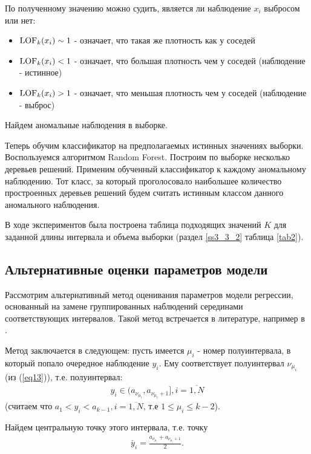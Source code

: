 По полученному значению можно судить, является ли наблюдение $x_i$ выбросом или нет:
\begin{itemize}
    \item $\textup{LOF}_k(x_i)\sim 1$   - означает, что такая же плотность как у соседей\\
    \item $\textup{LOF}_k(x_i)<1$  - означает, что большая плотность чем у соседей (наблюдение - истинное)\\
    \item $\textup{LOF}_k(x_i)>1$ - означает, что меньшая плотность чем у соседей (наблюдение - выброс) 
\end{itemize}

Найдем аномальные наблюдения в выборке.

Теперь обучим классификатор на предполагаемых истинных значениях выборки. Воспользуемся алгоритмом Random Forest. Построим по выборке несколько деревьев решений. 
Применим обученный классификатор к каждому аномальному наблюдению. Тот класс, за который проголосовало наибольшее количество простроенных деревьев решений будем считать истинным классом данного аномального наблюдения.

В ходе экспериментов была построена таблица подходящих значений $K$ для заданной длины интервала и объема выборки (раздел \ref{ss3_3_2} таблица \ref{tab2}).

\newpage
\subsection{Альтернативные оценки параметров модели}
Рассмотрим альтернативный метод оценивания параметров модели регрессии, основанный на замене группированных наблюдений серединами соответствующих интервалов. 
Такой метод встречается в литературе, например в \cite{interval_valued}.

Метод заключается в следующем:
пусть имеется $\mu_i$ - номер полуинтервала, в который попало очередное наблюдение $y_i$. Ему соответствует полуинтервал $\nu_{\mu_i}$ (из (\ref{eq13})), т.е. полуинтервал:
\begin{eqnarray}
    y_i\in (a_{\nu_{\mu_i}},a_{\nu_{\mu_i}+1}], i = \overline{1,N}
\end{eqnarray}
(считаем что $a_1<y_i<a_{k-1}, i=\overline{1,N}$, т.е $1\leq\mu_i\leq k-2$).

Найдем центральную точку этого интервала, т.е. точку
\begin{eqnarray}
    \check{y_i} = \frac{a_{\nu_{\mu_i}} + a_{\nu_{\mu_i}+1}}{2}.
\end{eqnarray}

